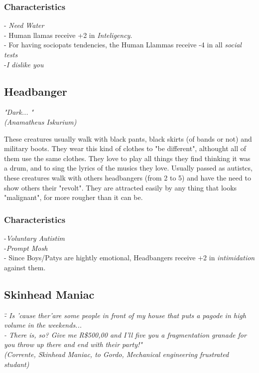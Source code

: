 \documentclass[ letterpaper,12pt]{article}
\begin{document}
\subsubsection{Characteristics}
- {\it Need Water}\\
- Human llamas receive +2 in {\it Inteligency}.\\
- For having sociopats tendencies, the Human Llammas receive -4 in all {\it social tests}\\
-{\it I dislike you}\\

\subsection{Headbanger}
{\it "Dark... "\\
(Anamatheus Iskurium)\\}

These creatures usually walk with black pants, black skirts (of bands or not) and military boots. They wear this kind of clothes to "be different", althought all of them use the same clothes. They love to play all things they find thinking it was a drum, and to sing the lyrics of the musics they love. Usually passed as autistcs, these creatures walk with others headbangers (from 2 to 5) and have the need to show others their "revolt". They are attracted easily by any thing that looks "malignant", for more rougher than it can be.

\subsubsection{Characteristics}
-{\it Voluntary Autistim}\\
-{\it Prompt Mosh}\\
- Since Boys/Patys are hightly emotional, Headbangers receive +2 in {\it intimidation} against them.

\subsection{Skinhead Maniac}
{\it \" - Is 'cause ther'are some people in front of my house that puts a pagode in high volume in the weekends...\\
 - There is, so? Give me R\$500,00 and I'll five you a fragmentation granade for you throw up there and end with their party!"\\
(Corrente, Skinhead Maniac, to Gordo, Mechanical engineering frustrated studant)}\\
\end{document}
